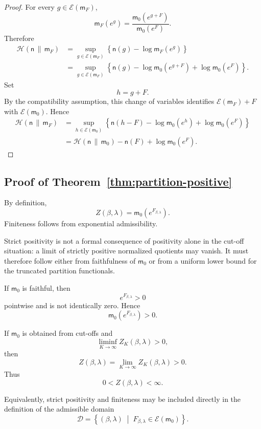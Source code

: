 \documentclass[11pt,reqno]{amsart}
\begin{document}
\begin{proof}
For every $g\in\mathcal E(\mathsf m_F)$,
\[
\mathsf m_F(e^g)
=
\frac{\mathsf m_0(e^{g+F})}{\mathsf m_0(e^F)}.
\]
Therefore
\begin{align*}
\mathcal H(\mathsf n\,\|\,\mathsf m_F)
&=
\sup_{g\in\mathcal E(\mathsf m_F)}
\left\{
\mathsf n(g)-\log\mathsf m_F(e^g)
\right\}
\\
&=
\sup_{g\in\mathcal E(\mathsf m_F)}
\left\{
\mathsf n(g)
-
\log\mathsf m_0(e^{g+F})
+
\log\mathsf m_0(e^F)
\right\}.
\end{align*}
Set
\[
h=g+F.
\]
By the compatibility assumption, this change of variables identifies
$\mathcal E(\mathsf m_F)+F$ with $\mathcal E(\mathsf m_0)$. Hence
\begin{align*}
\mathcal H(\mathsf n\,\|\,\mathsf m_F)
&=
\sup_{h\in\mathcal E(\mathsf m_0)}
\left\{
\mathsf n(h-F)
-
\log\mathsf m_0(e^h)
+
\log\mathsf m_0(e^F)
\right\}
\\
&=
\mathcal H(\mathsf n\,\|\,\mathsf m_0)
-
\mathsf n(F)
+
\log\mathsf m_0(e^F).
\end{align*}
\end{proof}

\subsection{Proof of Theorem~\ref{thm:partition-positive}}

By definition,
\[
Z(\beta,\lambda)
=
\mathsf m_0(e^{F_{\beta,\lambda}}).
\]
Finiteness follows from exponential admissibility.

Strict positivity is not a formal consequence of positivity alone in
the cut-off situation: a limit of strictly positive normalized
quotients may vanish. It must therefore follow either from faithfulness
of $\mathsf m_0$ or from a uniform lower bound for the truncated
partition functionals.

If $\mathsf m_0$ is faithful, then
\[
e^{F_{\beta,\lambda}}>0
\]
pointwise and is not identically zero. Hence
\[
\mathsf m_0(e^{F_{\beta,\lambda}})>0.
\]

If $\mathsf m_0$ is obtained from cut-offs and
\[
\liminf_{K\to\infty}Z_K(\beta,\lambda)>0,
\]
then
\[
Z(\beta,\lambda)
=
\lim_{K\to\infty}Z_K(\beta,\lambda)>0.
\]
Thus
\[
0<Z(\beta,\lambda)<\infty.
\]

Equivalently, strict positivity and finiteness may be included directly
in the definition of the admissible domain
\[
\mathcal D
=
\left\{
(\beta,\lambda)
\;\middle|\;
F_{\beta,\lambda}\in\mathcal E(\mathsf m_0)
\right\}.
\]
\end{document}
